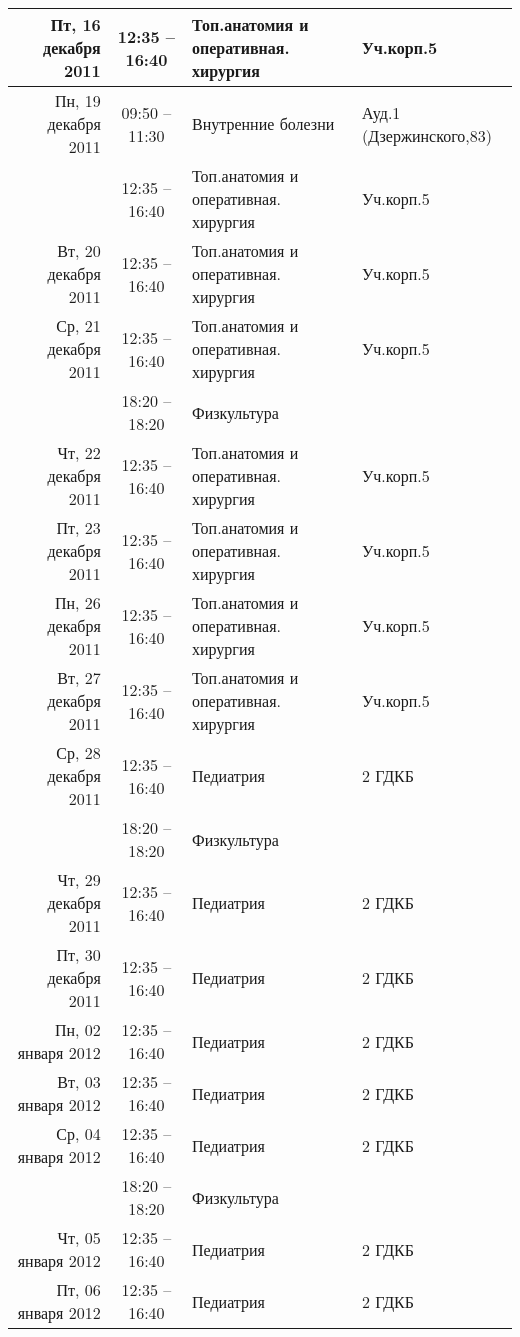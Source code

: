 \documentclass[a4paper,10pt,notitlepage]{report}
\begin{document}
\begin{center}
{\begin{longtable}{r|c|l|l|}
\hline Пт, 16 декабря 2011
  & 12:35 -- 16:40 & Топ.анатомия и оперативная. хирургия & Уч.корп.5 \\ \cline{2-4}
\hline Пн, 19 декабря 2011
  & 09:50 -- 11:30 & Внутренние болезни & Ауд.1 (Дзержинского,83) \\ \cline{2-4}
  & 12:35 -- 16:40 & Топ.анатомия и оперативная. хирургия & Уч.корп.5 \\ \cline{2-4}
\hline Вт, 20 декабря 2011
  & 12:35 -- 16:40 & Топ.анатомия и оперативная. хирургия & Уч.корп.5 \\ \cline{2-4}
\hline Ср, 21 декабря 2011
  & 12:35 -- 16:40 & Топ.анатомия и оперативная. хирургия & Уч.корп.5 \\ \cline{2-4}
  & 18:20 -- 18:20 & Физкультура &  \\ \cline{2-4}
\hline Чт, 22 декабря 2011
  & 12:35 -- 16:40 & Топ.анатомия и оперативная. хирургия & Уч.корп.5 \\ \cline{2-4}
\hline Пт, 23 декабря 2011
  & 12:35 -- 16:40 & Топ.анатомия и оперативная. хирургия & Уч.корп.5 \\ \cline{2-4}
\hline Пн, 26 декабря 2011
  & 12:35 -- 16:40 & Топ.анатомия и оперативная. хирургия & Уч.корп.5 \\ \cline{2-4}
\hline Вт, 27 декабря 2011
  & 12:35 -- 16:40 & Топ.анатомия и оперативная. хирургия & Уч.корп.5 \\ \cline{2-4}
\hline Ср, 28 декабря 2011
  & 12:35 -- 16:40 & Педиатрия & 2 ГДКБ \\ \cline{2-4}
  & 18:20 -- 18:20 & Физкультура &  \\ \cline{2-4}
\hline Чт, 29 декабря 2011
  & 12:35 -- 16:40 & Педиатрия & 2 ГДКБ \\ \cline{2-4}
\hline Пт, 30 декабря 2011
  & 12:35 -- 16:40 & Педиатрия & 2 ГДКБ \\ \cline{2-4}
\hline Пн, 02 января 2012
  & 12:35 -- 16:40 & Педиатрия & 2 ГДКБ \\ \cline{2-4}
\hline Вт, 03 января 2012
  & 12:35 -- 16:40 & Педиатрия & 2 ГДКБ \\ \cline{2-4}
\hline Ср, 04 января 2012
  & 12:35 -- 16:40 & Педиатрия & 2 ГДКБ \\ \cline{2-4}
  & 18:20 -- 18:20 & Физкультура &  \\ \cline{2-4}
\hline Чт, 05 января 2012
  & 12:35 -- 16:40 & Педиатрия & 2 ГДКБ \\ \cline{2-4}
\hline Пт, 06 января 2012
  & 12:35 -- 16:40 & Педиатрия & 2 ГДКБ \\ \cline{2-4}

\end{longtable}
}
\end{center}
\end{document}

